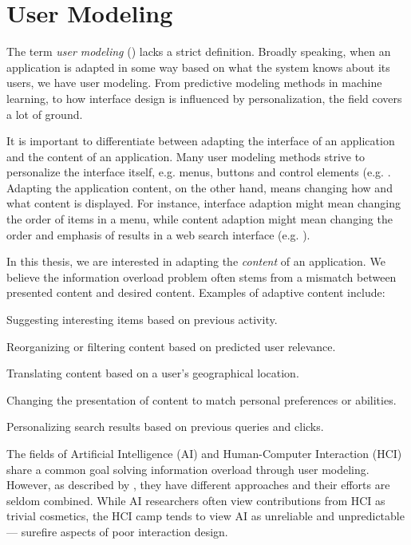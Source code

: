 \section{User Modeling}
\label{sec:modeling}

The term \emph{user modeling} () lacks a strict definition. 
Broadly speaking, when an application is adapted in some way based on what the system knows about its users, we have user modeling. 
From predictive modeling methods in machine learning, 
to how interface design is influenced by personalization, the field covers a lot of ground. 

It is important to differentiate between adapting the interface of an application and the content of an application. 
Many user modeling methods strive to personalize the interface itself, e.g. menus, buttons and control elements 
(e.g. \cite{Jameson2009, Fischer2001}. 
Adapting the application content, on the other hand, means changing how and what content is displayed.
For instance, interface adaption might mean changing the order of items in a menu, while content 
adaption might mean changing the order and emphasis of results in a web search interface
(e.g. \cite{Xu2008, Qiu2006, Rhodes2000}).

In this thesis, we are interested in adapting the \emph{content} of an application.
We believe the information overload problem often stems from a mismatch between presented content and desired content. 
Examples of adaptive content include:

\begin{itemize*}
  \item Suggesting interesting items based on previous activity.
  \item Reorganizing or filtering content based on predicted user relevance.
  \item Translating content based on a user's geographical location.
  \item Changing the presentation of content to match personal preferences or abilities.
  \item Personalizing search results based on previous queries and clicks.
\end{itemize*}

The fields of Artificial Intelligence (AI) and Human-Computer Interaction (HCI) share a common goal solving information overload through user modeling. 
However, as described by \cite[p6]{Lieberman2009}, they have different approaches and their efforts are seldom combined. 
While AI researchers often view contributions from HCI as trivial cosmetics, the HCI camp
tends to view AI as unreliable and unpredictable --- surefire aspects of poor interaction design.

